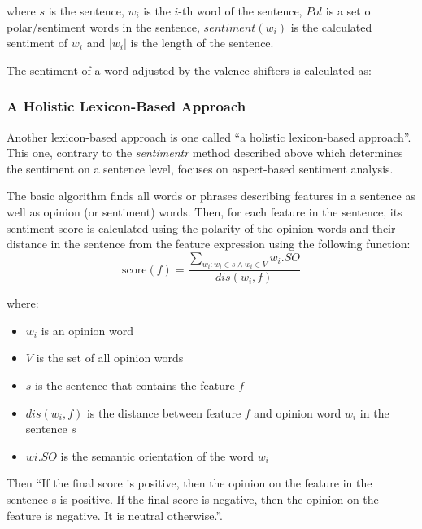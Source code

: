 where $s$ is the sentence, $w_{i}$ is the $i$-th word of the sentence, $Pol$ is a set o polar/sentiment words in the sentence, $sentiment(w_{i})$ is the calculated sentiment of $w_{i}$ and $|w_{i}|$ is the length of the sentence.

The sentiment of a word adjusted by the valence shifters is calculated as:

\subsubsection{A Holistic Lexicon-Based Approach} 
Another lexicon-based approach is one called ``a holistic lexicon-based approach''.\cite{ding_hu_liu} This one, contrary to the \textit{sentimentr} method described above which determines the sentiment on a sentence level, focuses on aspect-based sentiment analysis. 

The basic algorithm finds all words or phrases describing features in a sentence as well as opinion (or sentiment) words. Then, for each feature in the sentence, its sentiment score is calculated using the polarity of the opinion words and their distance in the sentence from the feature expression using the following function:
$$
\textrm{score}(f) = \frac{\sum_{w_{i} : w_{i} \in s \wedge w_{i} \in V}w_{i}.SO}{dis(w_{i},f)}
$$

where:
\begin{itemize}
\item $w_{i}$ is an opinion word
\item $V$ is the set of all opinion words
\item $s$ is the sentence that contains the feature $f$
\item  $dis(w_{i} , f)$ is the distance between feature $f$ and
opinion word $w_{i}$ in the sentence $s$
\item $w i .SO$ is the semantic orientation of the word $w_{i}$
\end{itemize}
Then ``If the final score is positive, then the opinion on the feature in
the sentence s is positive. If the final score is negative, then
the opinion on the feature is negative. It is neutral otherwise.''\cite{ding_hu_liu}.

